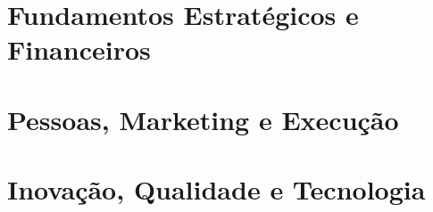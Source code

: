 \documentclass[12pt,a4paper]{abntex2}
\begin{document}
\tableofcontents
\newpage

\listoffigures
\newpage

\listoftables
\newpage


\newpage


\newpage


\newpage

\part{Fundamentos Estratégicos e Financeiros}







\part{Pessoas, Marketing e Execução}







\part{Inovação, Qualidade e Tecnologia}


\end{document}
